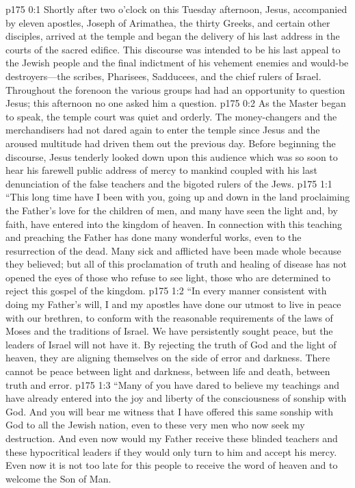 \author{Midwayer Commission}
\vs p175 0:1 Shortly after two o’clock on this Tuesday afternoon, Jesus, accompanied by eleven apostles, Joseph of Arimathea, the thirty Greeks, and certain other disciples, arrived at the temple and began the delivery of his last address in the courts of the sacred edifice. This discourse was intended to be his last appeal to the Jewish people and the final indictment of his vehement enemies and would\hyp{}be destroyers---the scribes, Pharisees, Sadducees, and the chief rulers of Israel. Throughout the forenoon the various groups had had an opportunity to question Jesus; this afternoon no one asked him a question.
\vs p175 0:2 As the Master began to speak, the temple court was quiet and orderly. The money\hyp{}changers and the merchandisers had not dared again to enter the temple since Jesus and the aroused multitude had driven them out the previous day. Before beginning the discourse, Jesus tenderly looked down upon this audience which was so soon to hear his farewell public address of mercy to mankind coupled with his last denunciation of the false teachers and the bigoted rulers of the Jews.\plusone
{}
\vs p175 1:1 \textcolor{ubdarkred}{“This long time have I been with you, going up and down in the land proclaiming the Father’s love for the children of men, and many have seen the light and, by faith, have entered into the kingdom of heaven. In connection with this teaching and preaching the Father has done many wonderful works, even to the resurrection of the dead. Many sick and afflicted have been made whole because they believed; but all of this proclamation of truth and healing of disease has not opened the eyes of those who refuse to see light, those who are determined to reject this gospel of the kingdom.}
\vs p175 1:2 \textcolor{ubdarkred}{“In every manner consistent with doing my Father’s will, I and my apostles have done our utmost to live in peace with our brethren, to conform with the reasonable requirements of the laws of Moses and the traditions of Israel. We have persistently sought peace, but the leaders of Israel will not have it. By rejecting the truth of God and the light of heaven, they are aligning themselves on the side of error and darkness. There cannot be peace between light and darkness, between life and death, between truth and error.}
\vs p175 1:3 \textcolor{ubdarkred}{“Many of you have dared to believe my teachings and have already entered into the joy and liberty of the consciousness of sonship with God. And you will bear me witness that I have offered this same sonship with God to all the Jewish nation, even to these very men who now seek my destruction. And even now would my Father receive these blinded teachers and these hypocritical leaders if they would only turn to him and accept his mercy. Even now it is not too late for this people to receive the word of heaven and to welcome the Son of Man.}
